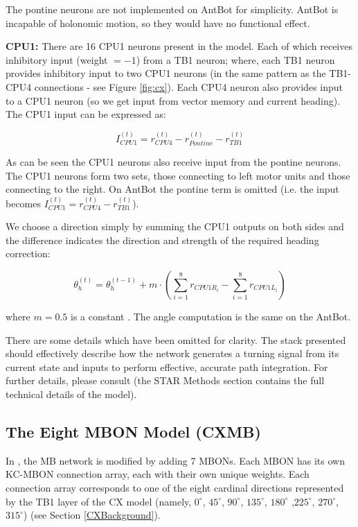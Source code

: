 \documentclass[a4paper,11pt,twoside,openright]{article}
\begin{document}
The pontine neurons are not implemented on AntBot for simplicity. AntBot is
incapable of holonomic motion, so they would have no functional effect.
\newline
\par

\textbf{CPU1:}
There are 16 CPU1 neurons present in the model. Each of which
receives inhibitory input (weight $= -1$) from a TB1 neuron; where, each
TB1 neuron provides inhibitory input to two CPU1 neurons (in the same pattern
as the TB1-CPU4 connections - see Figure \ref{fig:cx}). Each CPU4 neuron also
provides input to a CPU1 neuron (so we get input from vector memory and current
heading). The CPU1 input can be expressed as:

\begin{equation}
  I_{CPU1}^{(t)} = r_{CPU4}^{(t)} - r_{Pontine}^{(t)} - r_{TB1}^{(t)}
\end{equation}

As can be seen the CPU1 neurons also receive input from the pontine neurons.
The CPU1 neurons form two sets, those connecting to left motor units and those
connecting to the right. On AntBot the pontine term is omitted
(i.e. the input becomes
$I_{CPU1}^{(t)} = r_{CPU4}^{(t)} - r_{TB1}^{(t)}$).
\newline
\par

We choose a direction simply by summing the CPU1 outputs on both sides
and the difference indicates the direction and strength of the
required heading correction:

\begin{equation}
  \theta_h^{(t)} = \theta_h^{(t - 1)} +
  m \cdot (\sum_{i = 1}^{8} r_{CPU1R_{i}} - \sum_{i = 1}^{8} r_{CPU1L_{i}})
\end{equation}

where $m = 0.5$ is a constant \cite{Stone2017}. The angle computation is the
same on the AntBot.
\newline
\par

There are some details which have been omitted for clarity. The stack presented
should effectively describe how the network generates a turning signal from its
current state and inputs to perform effective, accurate path integration. For
further details, please consult \cite{Stone2017} (the STAR Methods section
contains the full technical details of the model).

\subsection{ The Eight MBON Model (CXMB) } \label{CXMBBackground}
In \cite{Zhang2017}, the MB network is modified by adding 7 MBONs. Each MBON has
its own KC-MBON connection array, each with their own unique weights. Each
connection array corresponds to one of the eight cardinal directions represented
by the TB1 layer of the CX model (namely, $0^{\circ}$, $45^{\circ}$,
$90^{\circ}$, $135^{\circ}$, $180^{\circ}$ ,$225^{\circ}$, $270^{\circ}$,
$315^{\circ}$) (see Section \ref{CXBackground}).
\newline
\par
\end{document}
